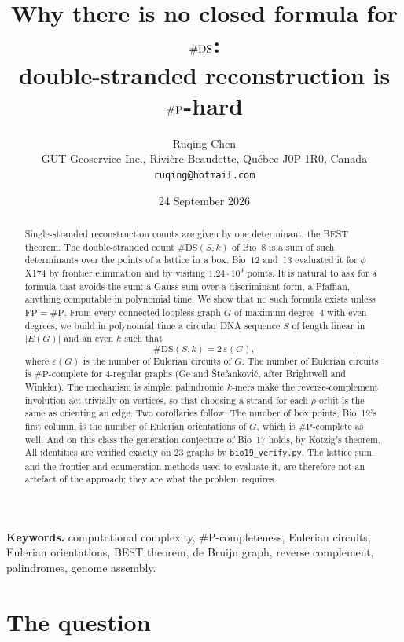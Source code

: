 \documentclass[11pt]{article}
\title{\bfseries Why there is no closed formula for $\#\DS$:\\
double-stranded reconstruction is $\sP$-hard}
\author{Ruqing Chen\\[2pt]
\normalsize GUT Geoservice Inc., Rivi\`ere-Beaudette, Qu\'ebec J0P 1R0, Canada\\
\normalsize\texttt{ruqing@hotmail.com}}
\date{24 September 2026}
\theoremstyle{plain}
\theoremstyle{definition}
\theoremstyle{remark}
\newcommand{\DS}{\mathrm{DS}}
\newcommand{\sP}{\#\mathrm{P}}
\begin{document}
\maketitle

\begin{abstract}
\noindent
Single-stranded reconstruction counts are given by one determinant, the BEST theorem. The
double-stranded count $\#\DS(S,k)$ of Bio~8 is a sum of such determinants over the points of a lattice
in a box. Bio~12 and~13 evaluated it for $\phi$X174 by frontier elimination and by visiting
$1.24\cdot10^9$ points. It is natural to ask for a formula that avoids the sum: a Gauss sum over a
discriminant form, a Pfaffian, anything computable in polynomial time. We show that no such formula
exists unless $\mathrm{FP}=\sP$. From every connected loopless graph $G$ of maximum degree~$4$ with even
degrees, we build in polynomial time a circular DNA sequence $S$ of length linear in $|E(G)|$ and an
even $k$ such that
\[
\#\DS(S,k)=2\,\varepsilon(G),
\]
where $\varepsilon(G)$ is the number of Eulerian circuits of $G$. The number of Eulerian circuits is
$\sP$-complete for $4$-regular graphs (Ge and \v Stefankovi\v c, after Brightwell and Winkler). The
mechanism is simple: palindromic $k$-mers make the reverse-complement involution act trivially on
vertices, so that choosing a strand for each $\rho$-orbit is the same as orienting an edge. Two
corollaries follow. The number of box points, Bio~12's first column, is the number of Eulerian
orientations of $G$, which is $\sP$-complete as well. And on this class the generation conjecture of
Bio~17 holds, by Kotzig's theorem. All identities are verified exactly on $23$ graphs by
\texttt{bio19\_verify.py}. The lattice sum, and the frontier and enumeration methods used to evaluate
it, are therefore not an artefact of the approach; they are what the problem requires.
\end{abstract}

\medskip
\noindent\textbf{Keywords.} computational complexity, $\sP$-completeness, Eulerian circuits, Eulerian
orientations, BEST theorem, de Bruijn graph, reverse complement, palindromes, genome assembly.

\section{The question}\label{sec:q}
\end{document}
